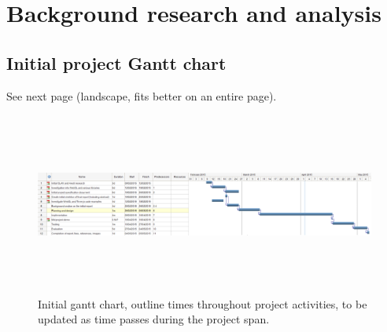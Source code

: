 \chapter{Background research and analysis}

\section{Initial project Gantt chart}
\label{app:gantt1}
See next page (landscape, fits better on an entire page).
\begin{landscape}
\begin{figure}[h!]
  \centering
   	\caption{Initial gantt chart, outline times throughout project activities, to be updated as time passes during the project span.}
      \includegraphics[width=23cm, height=6cm]{images/first.png}
\end{figure}
\end{landscape}
\clearpage

